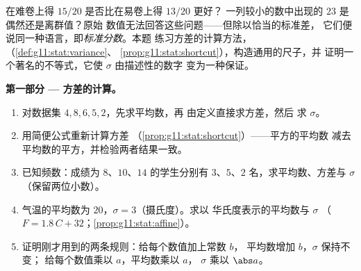 \begin{problem}
\label{pb:g11:stat:1}
在难卷上得 $15/20$ 是否比在易卷上得 $13/20$ 更好？
一列较小的数中出现的 $23$ 是偶然还是离群值？原始
数值无法回答这些问题——但除以恰当的标准差，
它们便说同一种语言，即\emph{标准分数}。本题
练习方差的计算方法，
（\cref{def:g11:stat:variance}、
\cref{prop:g11:stat:shortcut}），构造通用的尺子，并
证明一个著名的不等式，它使 $\sigma$ 由描述性的数字
变为一种保证。

\medskip
\noindent\textbf{第一部分 --- 方差的计算。}
\begin{enumerate}
  \item 对数据集 $4, 8, 6, 5, 2$，先求平均数，再
        由定义直接求方差，然后
        求 $\sigma$。
  \item 用简便公式重新计算方差
        （\cref{prop:g11:stat:shortcut}）——平方的平均数
        减去平均数的平方，并检验两者结果一致。
  \item 已知频数：成绩为 $8$、$10$、$14$ 的学生分别有
        $3$、$5$、$2$ 名，求平均数、方差与
        $\sigma$（保留两位小数）。
  \item 气温的平均数为 $20$，$\sigma = 3$（摄氏度）。求以
        华氏度表示的平均数与 $\sigma$
        （$F = 1.8\,C + 32$；\cref{prop:g11:stat:affine}）。
  \item 证明刚才用到的两条规则：给每个数值加上常数 $b$，
        平均数增加 $b$，$\sigma$ 保持不变；
        给每个数值乘以 $a$，平均数乘以 $a$，
        $\sigma$ 乘以 $\abs a$。
\end{enumerate}


\end{problem}
